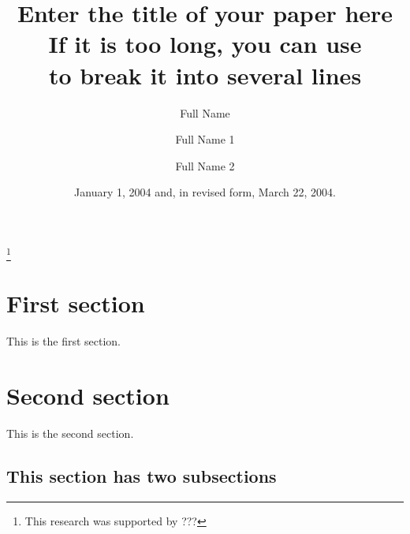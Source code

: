 \documentclass[10pt]{ijnam}
\begin{document}

\title[Sample for how to use ijnam.cls]
{Enter the title of your paper here\\
  If it is too long, you can use \\
  to break it into several lines}

\author[Short Name]{Full Name}
\address{
  Department of Mathematics,
  University of Newland,
  Newland, NL 88888, USA
}

\author[S. Name 1\and S. Name 2]{Full Name 1 \and Full Name 2}
\address{
  Department of Mathematics,
  University of Newland,
  Newland, NL 88888, USA
}



\date{January 1, 2004 and, in revised form, March 22, 2004.}

\thanks{This research was supported by ???}




\maketitle

\section{First section}
This is the first section.

\section{Second section}

This is the second section.

\subsection{This section has two subsections}
\end{document}
